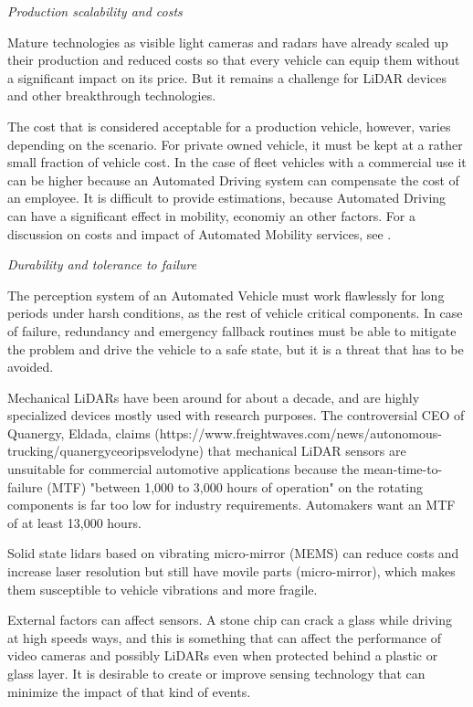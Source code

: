 \emph{Production scalability and costs}

Mature technologies as visible light cameras and radars have already scaled up 
their production and reduced costs so that every vehicle can equip them without
a significant impact on its price. But it remains a challenge for LiDAR devices
and other breakthrough technologies.

The cost that is considered acceptable for a production vehicle, however, 
varies depending on the scenario. For private owned vehicle, it must be kept at
a rather small fraction of vehicle cost. In the case of fleet vehicles with a 
commercial use it can be higher because an Automated Driving system can 
compensate the cost of an employee.
It is difficult to provide estimations, because Automated Driving can have a 
significant effect in mobility, economiy an other factors. For a discussion
on costs and impact of Automated Mobility services, see \cite{Bosch2018}.

\emph{Durability and tolerance to failure}

The perception system of an Automated Vehicle must work flawlessly for long
periods under harsh conditions, as the rest of vehicle critical components. 
In case of failure, redundancy and emergency fallback routines must be able to 
mitigate the problem and drive the vehicle to a safe state, but it is a 
threat that has to be avoided.

Mechanical LiDARs have been around for about a decade, and are highly 
specialized devices mostly used with research purposes.
The controversial CEO of Quanergy, Eldada, claims 
(https://www.freightwaves.com/news/autonomous-trucking/quanergyceoripsvelodyne)
that mechanical LiDAR sensors are unsuitable for commercial 
automotive applications because the mean-time-to-failure (MTF)
"between 1,000 to 3,000 hours of operation" on the rotating 
components is far too low for industry requirements. Automakers want an MTF
of at least 13,000 hours.

Solid state lidars based on vibrating micro-mirror (MEMS) can reduce costs and increase laser resolution but 
still have movile parts (micro-mirror), which makes them susceptible to vehicle vibrations and more fragile.

External factors can affect sensors. A stone chip can crack a glass while 
driving at high speeds ways, and this is something that can affect the 
performance of video cameras and possibly LiDARs even when protected behind
a plastic or glass layer. It is desirable to create or improve sensing 
technology that can minimize the impact of that kind of events.

